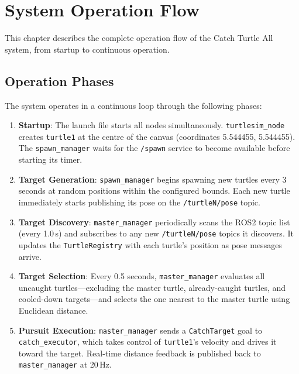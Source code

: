 \chapter{System Operation Flow\label{chap:flow}}

This chapter describes the complete operation flow of the Catch Turtle All system, from startup to continuous operation.

\section{Operation Phases}

The system operates in a continuous loop through the following phases:

\begin{enumerate}[label=\textbf{Phase \arabic*:}]
  \item \textbf{Startup}: The launch file starts all nodes simultaneously. \texttt{turtlesim\_node} creates \texttt{turtle1} at the centre of the canvas (coordinates 5.544455, 5.544455). The \texttt{spawn\_manager} waits for the \texttt{/spawn} service to become available before starting its timer.

  \item \textbf{Target Generation}: \texttt{spawn\_manager} begins spawning new turtles every 3 seconds at random positions within the configured bounds. Each new turtle immediately starts publishing its pose on the \texttt{/turtleN/pose} topic.

  \item \textbf{Target Discovery}: \texttt{master\_manager} periodically scans the ROS2 topic list (every 1.0\,s) and subscribes to any new \texttt{/turtleN/pose} topics it discovers. It updates the \texttt{TurtleRegistry} with each turtle's position as pose messages arrive.

  \item \textbf{Target Selection}: Every 0.5 seconds, \texttt{master\_manager} evaluates all uncaught turtles---excluding the master turtle, already-caught turtles, and cooled-down targets---and selects the one nearest to the master turtle using Euclidean distance.

  \item \textbf{Pursuit Execution}: \texttt{master\_manager} sends a \texttt{CatchTarget} goal to \texttt{catch\_executor}, which takes control of \texttt{turtle1}'s velocity and drives it toward the target. Real-time distance feedback is published back to \texttt{master\_manager} at 20\,Hz.


\end{enumerate}
